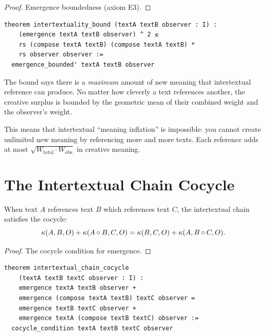 \begin{proof}
Emergence boundedness (axiom E3).
\end{proof}

\begin{lstlisting}
theorem intertextuality_bound (textA textB observer : I) :
    (emergence textA textB observer) ^ 2 ≤
    rs (compose textA textB) (compose textA textB) *
    rs observer observer :=
  emergence_bounded' textA textB observer
\end{lstlisting}

\begin{remark}
The bound says there is a \emph{maximum} amount of new meaning that
intertextual reference can produce.  No matter how cleverly a text
references another, the creative surplus is bounded by the
geometric mean of their combined weight and the observer's weight.

This means that intertextual ``meaning inflation'' is impossible:
you cannot create unlimited new meaning by referencing more and more
texts.  Each reference adds at most $\sqrt{W_{\text{total}} \cdot W_{\text{obs}}}$
in creative meaning.
\end{remark}

\section{The Intertextual Chain Cocycle}

\begin{theorem}
\label{thm:chain-cocycle}
When text $A$ references text $B$ which references text $C$, the
intertextual chain satisfies the cocycle:
\[
  \kappa(A, B, O) + \kappa(A \circ B, C, O)
  = \kappa(B, C, O) + \kappa(A, B \circ C, O).
\]
\end{theorem}

\begin{proof}
The cocycle condition for emergence.
\end{proof}

\begin{lstlisting}
theorem intertextual_chain_cocycle
    (textA textB textC observer : I) :
    emergence textA textB observer +
    emergence (compose textA textB) textC observer =
    emergence textB textC observer +
    emergence textA (compose textB textC) observer :=
  cocycle_condition textA textB textC observer
\end{lstlisting}

